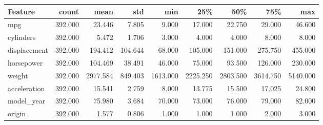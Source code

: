 \begin{tabular}{lrrrrrrrr}
\toprule
Feature & count & mean & std & min & 25\% & 50\% & 75\% & max \\
\midrule
mpg & 392.000 & 23.446 & 7.805 & 9.000 & 17.000 & 22.750 & 29.000 & 46.600 \\
cylinders & 392.000 & 5.472 & 1.706 & 3.000 & 4.000 & 4.000 & 8.000 & 8.000 \\
displacement & 392.000 & 194.412 & 104.644 & 68.000 & 105.000 & 151.000 & 275.750 & 455.000 \\
horsepower & 392.000 & 104.469 & 38.491 & 46.000 & 75.000 & 93.500 & 126.000 & 230.000 \\
weight & 392.000 & 2977.584 & 849.403 & 1613.000 & 2225.250 & 2803.500 & 3614.750 & 5140.000 \\
acceleration & 392.000 & 15.541 & 2.759 & 8.000 & 13.775 & 15.500 & 17.025 & 24.800 \\
model\_year & 392.000 & 75.980 & 3.684 & 70.000 & 73.000 & 76.000 & 79.000 & 82.000 \\
origin & 392.000 & 1.577 & 0.806 & 1.000 & 1.000 & 1.000 & 2.000 & 3.000 \\
\bottomrule
\end{tabular}